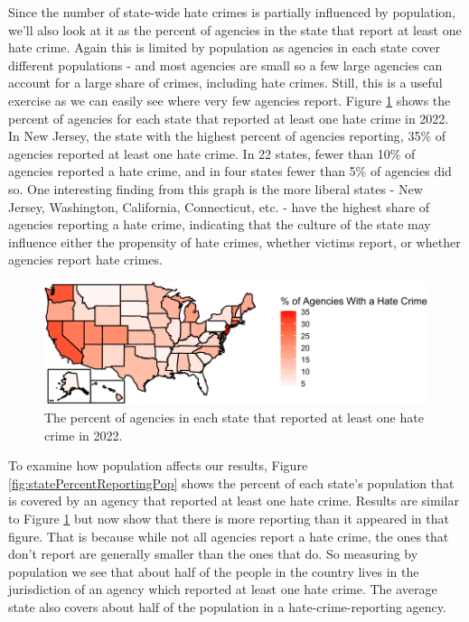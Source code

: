 \documentclass[
  12pt,
  openany]{book}
\begin{document}
Since the number of state-wide hate crimes is partially influenced by population, we'll also look at it as the percent of agencies in the state that report at least one hate crime. Again this is limited by population as agencies in each state cover different populations - and most agencies are small so a few large agencies can account for a large share of crimes, including hate crimes. Still, this is a useful exercise as we can easily see where very few agencies report. Figure \ref{fig:statePercentReporting} shows the percent of agencies for each state that reported at least one hate crime in 2022. In New Jersey, the state with the highest percent of agencies reporting, 35\% of agencies reported at least one hate crime. In 22 states, fewer than 10\% of agencies reported a hate crime, and in four states fewer than 5\% of agencies did so. One interesting finding from this graph is the more liberal states - New Jersey, Washington, California, Connecticut, etc. - have the highest share of agencies reporting a hate crime, indicating that the culture of the state may influence either the propensity of hate crimes, whether victims report, or whether agencies report hate crimes.

\begin{figure}

{\centering \includegraphics[width=0.9\linewidth]{09_hate_crime_files/figure-latex/statePercentReporting-1} 

}

\caption{The percent of agencies in each state that reported at least one hate crime in 2022.}\label{fig:statePercentReporting}
\end{figure}

To examine how population affects our results, Figure \ref{fig:statePercentReportingPop} shows the percent of each state's population that is covered by an agency that reported at least one hate crime. Results are similar to Figure \ref{fig:statePercentReporting} but now show that there is more reporting than it appeared in that figure. That is because while not all agencies report a hate crime, the ones that don't report are generally smaller than the ones that do. So measuring by population we see that about half of the people in the country lives in the jurisdiction of an agency which reported at least one hate crime. The average state also covers about half of the population in a hate-crime-reporting agency.
\end{document}

